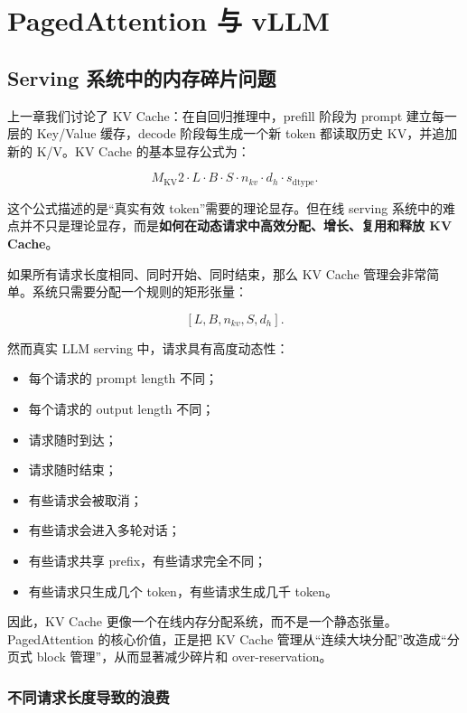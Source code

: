 \chapter{PagedAttention 与 vLLM}
\label{chap:paged-attention-vllm}

\section{Serving 系统中的内存碎片问题}
\label{sec:serving-memory-fragmentation}

上一章我们讨论了 KV Cache：在自回归推理中，prefill 阶段为 prompt 建立每一层的 Key/Value 缓存，decode 阶段每生成一个新 token 都读取历史 KV，并追加新的 K/V。KV Cache 的基本显存公式为：

\[
M_{\mathrm{KV}}
2
\cdot
L
\cdot
B
\cdot
S
\cdot
n_{kv}
\cdot
d_h
\cdot
s_{\mathrm{dtype}}.
\]

这个公式描述的是“真实有效 token”需要的理论显存。但在线 serving 系统中的难点并不只是理论显存，而是\textbf{如何在动态请求中高效分配、增长、复用和释放 KV Cache}。

如果所有请求长度相同、同时开始、同时结束，那么 KV Cache 管理会非常简单。系统只需要分配一个规则的矩形张量：

\[
[L,B,n_{kv},S,d_h].
\]

然而真实 LLM serving 中，请求具有高度动态性：

\begin{itemize}
\item 每个请求的 prompt length 不同；
\item 每个请求的 output length 不同；
\item 请求随时到达；
\item 请求随时结束；
\item 有些请求会被取消；
\item 有些请求会进入多轮对话；
\item 有些请求共享 prefix，有些请求完全不同；
\item 有些请求只生成几个 token，有些请求生成几千 token。
\end{itemize}

因此，KV Cache 更像一个在线内存分配系统，而不是一个静态张量。PagedAttention 的核心价值，正是把 KV Cache 管理从“连续大块分配”改造成“分页式 block 管理”，从而显著减少碎片和 over-reservation。

\subsection{不同请求长度导致的浪费}
\label{subsec:waste-from-variable-request-lengths}

